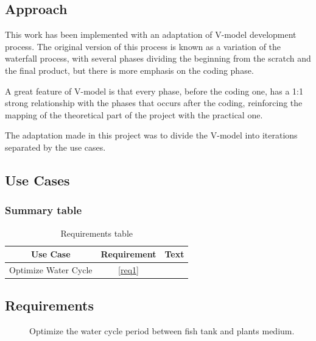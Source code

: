 \subsection{Approach}
This work has been implemented with an adaptation of V-model development process.
The original version of this process is known as a variation of the waterfall process,
with several phases dividing the beginning from the scratch and the final product,
but there is more emphasis on the coding phase.

A great feature of V-model is that every phase,
before the coding one,
has a 1:1 strong relationship with the phases that occurs after the coding,
reinforcing the mapping of the theoretical part of the project with the practical one.

The adaptation made in this project was to divide the V-model into iterations separated by the use cases.


\subsection{Use Cases}


\subsubsection{Summary table}

\begin{table}[h]
\centering
\caption{Requirements table}
\label{tab:requirementsTable}
\begin{tabular}{|c|c|c|}
\hline
\textbf{Use Case}    & \textbf{Requirement} & \textbf{Text} \\ \hline
Optimize Water Cycle & \ref{req1}           &                 \\ \hline
\end{tabular}
\end{table}

\subsection{Requirements}

\begin{description}

\item []
Optimize the water cycle period between fish tank and plants medium.

\end{description}

